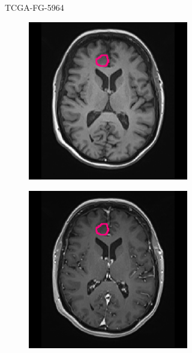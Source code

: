 \begin{subappendices}
\begin{figure}[htbp]
\begin{subfigure}[b]{0.8\textwidth}
\begin{subfigure}[b]{0.215\textwidth}
        \end{subfigure}
        \caption{TCGA-FG-5964}
    \end{subfigure}
    \begin{subfigure}[b]{0.8\textwidth}
        \centering
        \hfill
        \begin{subfigure}[b]{0.215\textwidth}
        \includegraphics[width=\textwidth, clip, trim=2.5cm 0.5cm 2.5cm 0.5cm]{Figures/Random_segs/T1_TCGA-FG-A713.png}
        \end{subfigure}
        \hfill
        \begin{subfigure}[b]{0.215\textwidth}
        \includegraphics[width=\textwidth, clip, trim=2.5cm 0.5cm 2.5cm 0.5cm]{Figures/Random_segs/T1GD_TCGA-FG-A713.png}

\end{subfigure}
\end{subfigure}
\end{figure}
\end{subappendices}
